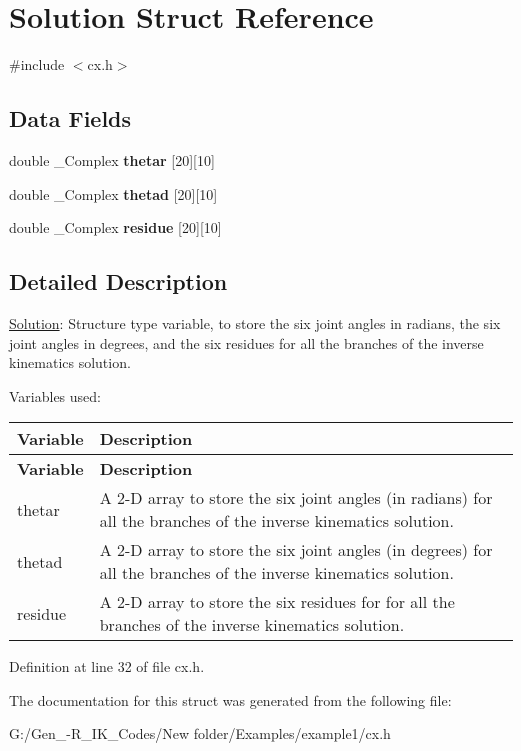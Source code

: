 \hypertarget{struct_solution}{}\section{Solution Struct Reference}
\label{struct_solution}


{\ttfamily \#include $<$cx.\+h$>$}

\subsection*{Data Fields}
\begin{DoxyCompactItemize}
\item 
\mbox{\label{struct_solution_a1ce2dc2e3874867ac9c9c10d4152e285}} 
double \+\_\+\+Complex {\bfseries thetar} \mbox{[}20\mbox{]}\mbox{[}10\mbox{]}
\item 
\mbox{\label{struct_solution_aab13a66a6f49c2222e26cebc1db1468d}} 
double \+\_\+\+Complex {\bfseries thetad} \mbox{[}20\mbox{]}\mbox{[}10\mbox{]}
\item 
\mbox{\label{struct_solution_a93572d193d49e1c5672276bb34b9a3cf}} 
double \+\_\+\+Complex {\bfseries residue} \mbox{[}20\mbox{]}\mbox{[}10\mbox{]}
\end{DoxyCompactItemize}


\subsection{Detailed Description}
\hyperlink{struct_solution}{Solution}\+: Structure type variable, to store the six joint angles in radians, the six joint angles in degrees, and the six residues for all the branches of the inverse kinematics solution.

Variables used\+: \tabulinesep=1mm
\begin{longtabu} spread 0pt [c]{*{2}{|X[-1]}|}
\hline
\rowcolor{\tableheadbgcolor}\textbf{ Variable }&\textbf{ Description  }\\
\endfirsthead
\hline
\endfoot
\hline
\rowcolor{\tableheadbgcolor}\textbf{ Variable }&\textbf{ Description  }\\
\endhead
thetar &A 2-\/D array to store the six joint angles (in radians) for all the branches of the inverse kinematics solution. \\
thetad &A 2-\/D array to store the six joint angles (in degrees) for all the branches of the inverse kinematics solution. \\
residue &A 2-\/D array to store the six residues for for all the branches of the inverse kinematics solution. \\
\end{longtabu}


Definition at line 32 of file cx.\+h.



The documentation for this struct was generated from the following file\+:\begin{DoxyCompactItemize}
\item 
G\+:/\+Gen\+\_-\/\+R\+\_\+\+I\+K\+\_\+\+Codes/\+New folder/\+Examples/example1/cx.\+h\end{DoxyCompactItemize}
